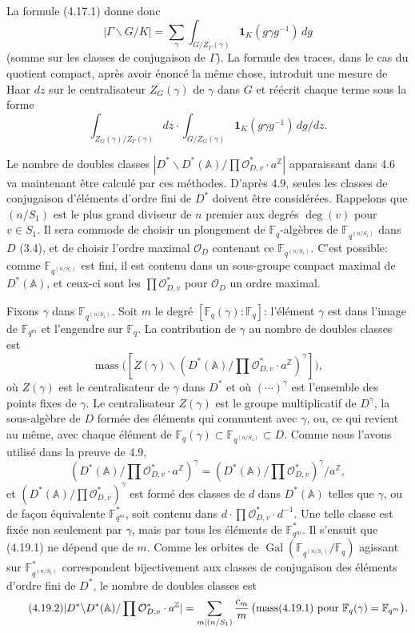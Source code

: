 \documentclass[10pt]{article}
\newcommand{\Fq}{\mathbb F_q}
\newcommand{\Fqm}{\mathbb F_{q^m}}
\newcommand{\Z}{\mathbb Z}
\newcommand{\Adele}{\mathbb A}
\newcommand{\Gal}{\operatorname{Gal}}
\newcommand{\degm}{\operatorname{deg}}
\newcommand{\mass}{\operatorname{mass}}
\newcommand{\OD}{\mathcal O_D}
\theoremstyle{deligne}
\newcommand{\heading}[1]{\vspace{0.7em}\noindent{\bfseries #1}\quad}
\begin{document}
La formule (4.17.1) donne donc
\begin{equation}\tag{4.18.2}
|\Gamma\backslash G/K|=\sum_\gamma\int_{G/Z_\Gamma(\gamma)}\mathbf 1_K(g\gamma g^{-1})\,dg
\end{equation}
(somme sur les classes de conjugaison de $\Gamma$). La formule des traces, dans le cas du quotient compact, après avoir énoncé la même chose, introduit une mesure de Haar $dz$ sur le centralisateur $Z_G(\gamma)$ de $\gamma$ dans $G$ et réécrit chaque terme sous la forme
\[
\int_{Z_G(\gamma)/Z_\Gamma(\gamma)}dz\cdot
\int_{G/Z_G(\gamma)}\mathbf 1_K(g\gamma g^{-1})\,dg/dz.
\]

\heading{4.19.} Le nombre de doubles classes $|D^*\backslash D^*(\Adele)/\prod\mathcal O_{D,v}^*\cdot a^\Z|$ apparaissant dans 4.6 va maintenant être calculé par ces méthodes. D'après 4.9, seules les classes de conjugaison d'éléments d'ordre fini de $D^*$ doivent être considérées. Rappelons que $(n/S_1)$ est le plus grand diviseur de $n$ premier aux degrés $\degm(v)$ pour $v\in S_1$. Il sera commode de choisir un plongement de $\Fq$-algèbres de $\mathbb F_{q^{(n/S_1)}}$ dans $D$ (3.4), et de choisir l'ordre maximal $\OD$ contenant ce $\mathbb F_{q^{(n/S_1)}}$. C'est possible: comme $\mathbb F_{q^{(n/S_1)}}$ est fini, il est contenu dans un sous-groupe compact maximal de $D^*(\Adele)$, et ceux-ci sont les $\prod\mathcal O_{D,v}^*$ pour $\OD$ un ordre maximal.

Fixons $\gamma$ dans $\mathbb F_{q^{(n/S_1)}}$. Soit $m$ le degré $[\Fq(\gamma):\Fq]$: l'élément $\gamma$ est dans l'image de $\Fqm$ et l'engendre sur $\Fq$. La contribution de $\gamma$ au nombre de doubles classes est
\begin{equation}\tag{4.19.1}
\mass\bigl([Z(\gamma)\backslash (D^*(\Adele)/\prod\mathcal O_{D,v}^*\cdot a^\Z)^\gamma]\bigr),
\end{equation}
où $Z(\gamma)$ est le centralisateur de $\gamma$ dans $D^*$ et où $(\cdots)^\gamma$ est l'ensemble des points fixes de $\gamma$. Le centralisateur $Z(\gamma)$ est le groupe multiplicatif de $D^\gamma$, la sous-algèbre de $D$ formée des éléments qui commutent avec $\gamma$, ou, ce qui revient au même, avec chaque élément de $\Fq(\gamma)\subset \mathbb F_{q^{(n/S_1)}}\subset D$. Comme nous l'avons utilisé dans la preuve de 4.9,
\[
(D^*(\Adele)/\prod\mathcal O_{D,v}^*\cdot a^\Z)^\gamma=(D^*(\Adele)/\prod\mathcal O_{D,v}^*)^\gamma/a^\Z,
\]
et $(D^*(\Adele)/\prod\mathcal O_{D,v}^*)^\gamma$ est formé des classes de $d$ dans $D^*(\Adele)$ telles que $\gamma$, ou de façon équivalente $\Fqm^*$, soit contenu dans $d\cdot\prod\mathcal O_{D,v}^*\cdot d^{-1}$. Une telle classe est fixée non seulement par $\gamma$, mais par tous les éléments de $\Fqm^*$. Il s'ensuit que (4.19.1) ne dépend que de $m$. Comme les orbites de $\Gal(\mathbb F_{q^{(n/S_1)}}/\Fq)$ agissant sur $\mathbb F_{q^{(n/S_1)}}^*$ correspondent bijectivement aux classes de conjugaison des éléments d'ordre fini de $D^*$, le nombre de doubles classes est
\begin{equation}\tag{4.19.2}
|D^*\backslash D^*(\Adele)/\prod\mathcal O_{D,v}^*\cdot a^\Z|
=\sum_{m\mid(n/S_1)}\frac{c_m}{m}\,\bigl(\mass(4.19.1)\hbox{ pour }\Fq(\gamma)=\Fqm\bigr).
\end{equation}
\end{document}
